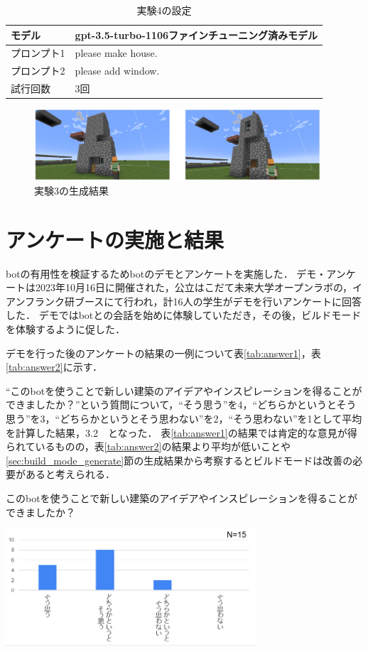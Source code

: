 \begin{table}[H]
    \caption{実験4の設定}\label{tab:setting4}
    \centering
    \begin{tabular}{ll}
        \hline \hline
        モデル & gpt-3.5-turbo-1106ファインチューニング済みモデル \\
        \hline
        プロンプト1 & please make house. \\
        \hline
        プロンプト2 & please add window. \\
        \hline
        試行回数 & 3回 \\
        \hline
    \end{tabular}
\end{table}

\begin{figure}[H]
    \centering
    \includegraphics[width=0.95\textwidth]{fig/add_window2.PNG}
    \caption{実験3の生成結果}
    \label{fig:add_window2}
\end{figure}

\section{アンケートの実施と結果}\label{sec:survey_result}
botの有用性を検証するためbotのデモとアンケートを実施した．
デモ・アンケートは2023年10月16日に開催された，公立はこだて未来大学オープンラボの，イアンフランク研ブースにて行われ，計16人の学生がデモを行いアンケートに回答した．
デモではbotとの会話を始めに体験していただき，その後，ビルドモードを体験するように促した．

デモを行った後のアンケートの結果の一例について表\ref{tab:answer1}，表\ref{tab:answer2}に示す．

``このbotを使うことで新しい建築のアイデアやインスピレーションを得ることができましたか？''という質問について，``そう思う''を4，``どちらかというとそう思う''を3，``どちらかというとそう思わない''を2，``そう思わない''を1として平均を計算した結果，3.2　となった．
表\ref{tab:answer1}の結果では肯定的な意見が得られているものの，表\ref{tab:answer2}の結果より平均が低いことや\ref{sec:build_mode_generate}節の生成結果から考察するとビルドモードは改善の必要があると考えられる．
\begin{table}[H]
    \centering
    \caption{このbotを使うことで新しい建築のアイデアやインスピレーションを得ることができましたか？}
    \label{tab:answer1}
    \includegraphics[width=0.7\textwidth]{fig/tab2.png}
\end{table}


